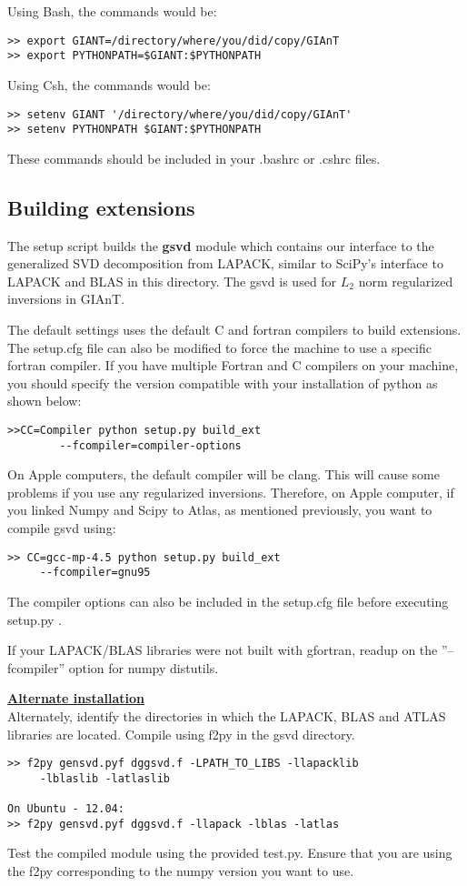 \noindent Using Bash, the commands would be:
\begin{verbatim}
>> export GIANT=/directory/where/you/did/copy/GIAnT
>> export PYTHONPATH=$GIANT:$PYTHONPATH
\end{verbatim}
Using Csh, the commands would be:
\begin{verbatim}
>> setenv GIANT '/directory/where/you/did/copy/GIAnT'
>> setenv PYTHONPATH $GIANT:$PYTHONPATH
\end{verbatim}
These commands should be included in your .bashrc or .cshrc files.

\subsection{Building extensions}
\label{sec:build_ext}
The setup script builds the \textbf{gsvd} module which contains our interface to the generalized SVD decomposition from LAPACK, similar to SciPy's interface to LAPACK and BLAS in this directory. The gsvd is used for $L_2$ norm regularized inversions in GIAnT. 

The default settings uses the default C and fortran compilers to build extensions. The setup.cfg file can also be modified to force the machine to use a specific fortran compiler. If you have multiple Fortran and C compilers on your machine, you should specify the version compatible with your installation of python as shown below:
\begin{verbatim}
>>CC=Compiler python setup.py build_ext 
		--fcompiler=compiler-options
\end{verbatim}

On Apple computers, the default compiler will be clang. This will cause some problems if you use any regularized inversions. Therefore, on Apple computer, if you linked Numpy and Scipy to Atlas, as mentioned previously, you want to compile gsvd using:
\begin{verbatim}
>> CC=gcc-mp-4.5 python setup.py build_ext
	 --fcompiler=gnu95
\end{verbatim}
The compiler options can also be included in the setup.cfg file before executing setup.py .

If your LAPACK/BLAS libraries were not built with gfortran, readup on the ''--fcompiler'' option for numpy distutils.

\vspace{1cm}
\noindent \underline{\textbf{Alternate installation}} \\
Alternately, identify the directories in which the LAPACK, BLAS and ATLAS libraries are located. Compile using f2py in the gsvd directory.
\begin{verbatim}
>> f2py gensvd.pyf dggsvd.f -LPATH_TO_LIBS -llapacklib 
     -lblaslib -latlaslib

On Ubuntu - 12.04:
>> f2py gensvd.pyf dggsvd.f -llapack -lblas -latlas
\end{verbatim}
Test the compiled module using the provided test.py. Ensure that you are using the f2py corresponding to the numpy version you want to use.


